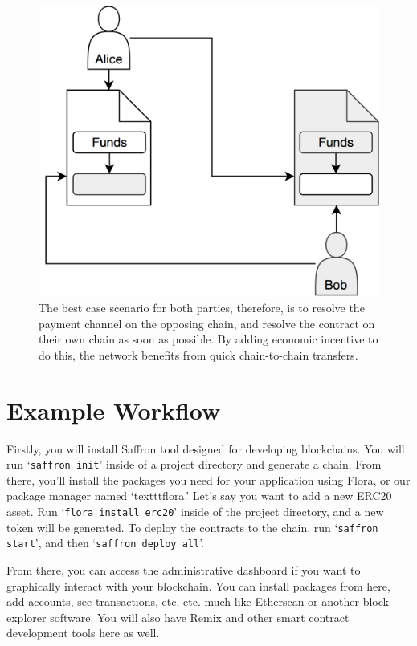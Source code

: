 \documentclass{%
	article}
\begin{document}
\begin{figure}[H]
\centering
\includegraphics[scale=0.112]{fig6.png}
\caption{\small\textnormal{The best case scenario for both parties, therefore, is to resolve the payment channel on the opposing chain, and resolve the contract on their own chain as soon as possible. By adding economic incentive to do this, the network benefits from quick chain-to-chain transfers.}}
\end{figure}

\section{Example Workflow}
Firstly, you will install Saffron tool designed for developing blockchains. You will run ‘\texttt{saffron init}' inside of a project directory and generate a chain. From there, you'll install the packages you need for your application using Flora, or our package manager named ‘texttt{flora}.' Let's say you want to add a new ERC20 asset. Run ‘\texttt{flora install erc20}' inside of the project directory, and a new token will be generated. To deploy the contracts to the chain, run ‘\texttt{saffron start}', and then ‘\texttt{saffron deploy all}'.

From there, you can access the administrative dashboard if you want to graphically interact with your blockchain. You can install packages from here, add accounts, see transactions, etc. etc. much like Etherscan or another block explorer software. You will also have Remix and other smart contract development tools here as well.
\end{document}
